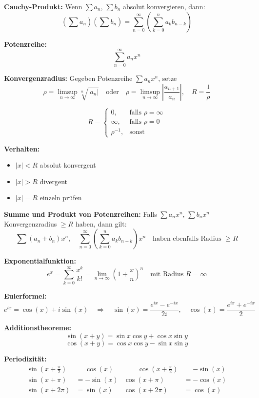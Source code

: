 \textbf{Cauchy-Produkt:}  
Wenn \( \sum a_n \), \( \sum b_n \) absolut konvergieren, dann:
\[
\left( \sum a_n \right) \left( \sum b_n \right)
= \sum_{n=0}^\infty \left( \sum_{k=0}^n a_k b_{n-k} \right)
\]

\textbf{Potenzreihe:}  
\[
\sum_{n=0}^\infty a_n x^n
\]

\textbf{Konvergenzradius:}  
Gegeben Potenzreihe \( \sum a_n x^n \), setze
\[
\rho = \limsup_{n \to \infty} \sqrt[n]{|a_n|} \quad \text{oder} \quad
\rho = \limsup_{n \to \infty} \left| \frac{a_{n+1}}{a_n} \right|, \quad
R = \frac{1}{\rho}
\]

\[
R =
\begin{cases}
0, & \text{falls } \rho = \infty \\
\infty, & \text{falls } \rho = 0 \\
\rho^{-1}, & \text{sonst}
\end{cases}
\]

\textbf{Verhalten:}
\begin{itemize}
  \item \( |x| < R \) \quad absolut konvergent
  \item \( |x| > R \) \quad divergent
  \item \( |x| = R \) \quad einzeln prüfen
\end{itemize}

\vspace{0.5em}

\textbf{Summe und Produkt von Potenzreihen:}  
Falls \( \sum a_n x^n \), \( \sum b_n x^n \) Konvergenzradius \( \geq R \) haben, dann gilt:
\[
\sum (a_n + b_n)x^n, \quad
\sum_{n=0}^\infty \left( \sum_{k=0}^n a_k b_{n-k} \right) x^n
\quad \text{haben ebenfalls Radius } \geq R
\]

\vspace{0.5em}

\textbf{Exponentialfunktion:}
\[
e^x = \sum_{k=0}^\infty \frac{x^k}{k!} = \lim_{n \to \infty} \left(1 + \frac{x}{n}\right)^n
\quad \text{mit Radius } R = \infty
\]

\textbf{Eulerformel:}  
\[
e^{ix} = \cos(x) + i \sin(x)
\quad\Rightarrow\quad
\sin(x) = \frac{e^{ix} - e^{-ix}}{2i},\quad
\cos(x) = \frac{e^{ix} + e^{-ix}}{2}
\]

\textbf{Additionstheoreme:}  
\[
\sin(x + y) = \sin x \cos y + \cos x \sin y
\]
\[
\cos(x + y) = \cos x \cos y - \sin x \sin y
\]

\textbf{Periodizität:}
\[
\begin{aligned}
\sin(x + \tfrac{\pi}{2}) &= \cos(x) & \qquad \cos(x + \tfrac{\pi}{2}) &= -\sin(x) \\
\sin(x + \pi) &= -\sin(x) & \cos(x + \pi) &= -\cos(x) \\
\sin(x + 2\pi) &= \sin(x) & \cos(x + 2\pi) &= \cos(x)
\end{aligned}
\]

